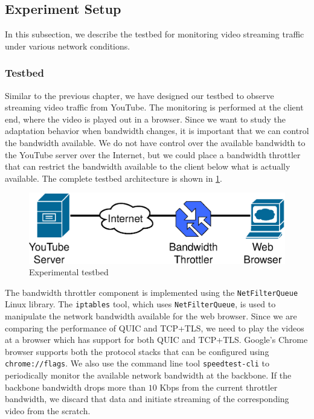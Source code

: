 \subsection{Experiment Setup}
\label{sec:experiments}

In this subsection, we describe the testbed for monitoring video streaming traffic under various network conditions.

\subsubsection{Testbed}
Similar to the previous chapter, we have designed our testbed to observe streaming video traffic from YouTube. 
The monitoring is performed at the client end, where the video is played out in a browser.
Since we want to study the adaptation behavior when bandwidth changes, it is important that we can control the bandwidth available.
We do not have control over the available bandwidth to the YouTube server over the Internet, but we could place a bandwidth throttler that can restrict the bandwidth available to the client below what is actually available.
The complete testbed architecture is shown in \fig\ref{fig:experimentalSetup}.

\begin{figure}[!t]
	\centering
	\includegraphics[width=0.7\linewidth]{img/experimentalSetup}
	\caption{Experimental testbed}
	\label{fig:experimentalSetup}
\end{figure}

The bandwidth throttler component is implemented using the {\tt NetFilterQueue} Linux library.
The {\tt iptables} tool, which uses {\tt NetFilterQueue}, is used to manipulate the network bandwidth available for the web browser.
Since we are comparing the performance of \ac{QUIC} and \ac{TCP}+\ac{TLS}, we need to play the videos at a browser which has support for both \ac{QUIC} and \ac{TCP}+\ac{TLS}. Google's Chrome browser supports both the protocol stacks that can be configured using {\tt chrome://flags}. We also use the command line tool \texttt{speedtest-cli} to periodically monitor the available network bandwidth at the backbone. If the backbone bandwidth drops more than $10$ Kbps from the current throttler bandwidth, we discard that data and initiate streaming of the corresponding video from the scratch.

